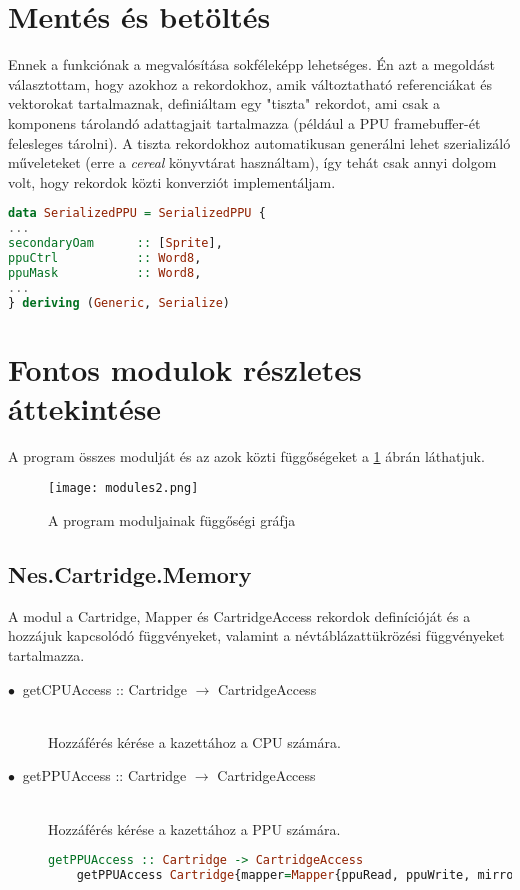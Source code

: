 \section{Mentés és betöltés}

Ennek a funkciónak a megvalósítása sokféleképp lehetséges. Én azt a megoldást választottam, hogy azokhoz a rekordokhoz, amik változtatható referenciákat és vektorokat tartalmaznak, definiáltam egy "tiszta" rekordot, ami csak a komponens tárolandó adattagjait tartalmazza (például a PPU framebuffer-ét felesleges tárolni). A tiszta rekordokhoz automatikusan generálni lehet szerializáló műveleteket (erre a \emph{cereal} könyvtárat használtam), így tehát csak annyi dolgom volt, hogy rekordok közti konverziót implementáljam.

\begin{lstlisting}[language=Haskell]
data SerializedPPU = SerializedPPU {
...
secondaryOam      :: [Sprite],
ppuCtrl           :: Word8,
ppuMask           :: Word8,
...
} deriving (Generic, Serialize)
\end{lstlisting}

\section{Fontos modulok részletes áttekintése}

A program összes modulját és az azok közti függőségeket a \ref{fig:modules} ábrán láthatjuk.

\begin{figure}[H]
	\centering
	\texttt{[image: modules2.png]}
	\caption{A program moduljainak függőségi gráfja}
	\label{fig:modules}
\end{figure}

\subsection{Nes.Cartridge.Memory}
A modul a Cartridge, Mapper és CartridgeAccess rekordok definícióját és a hozzájuk kapcsolódó függvényeket, valamint a névtáblázattükrözési függvényeket tartalmazza.

\begin{description}
	\item[$\bullet\:$ getCPUAccess :: Cartridge $\rightarrow$ CartridgeAccess] \hfill \\
	Hozzáférés kérése a kazettához a CPU számára.
	\item[$\bullet\:$ getPPUAccess :: Cartridge $\rightarrow$ CartridgeAccess] \hfill \\
	Hozzáférés kérése a kazettához a PPU számára.
	\begin{lstlisting}[language=Haskell, basicstyle=\scriptsize]
	getPPUAccess :: Cartridge -> CartridgeAccess
	getPPUAccess Cartridge{mapper=Mapper{ppuRead, ppuWrite, mirroringFunction}} = CartridgeAccess ppuRead ppuWrite mirroringFunction
	\end{lstlisting}
\end{description}

